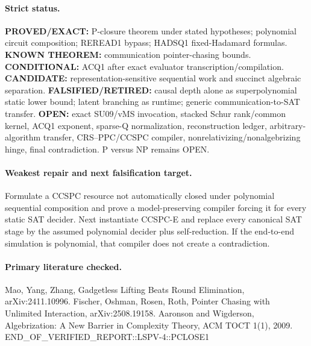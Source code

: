 \documentclass[11pt]{article}
\begin{document}
\paragraph{Strict status.} \textbf{PROVED/EXACT:} P-closure theorem under stated hypotheses; polynomial circuit composition; REREAD1 bypass; HADSQ1 fixed-Hadamard formulas. \textbf{KNOWN THEOREM:} communication pointer-chasing bounds. \textbf{CONDITIONAL:} ACQ1 after exact evaluator transcription/compilation. \textbf{CANDIDATE:} representation-sensitive sequential work and succinct algebraic separation. \textbf{FALSIFIED/RETIRED:} causal depth alone as superpolynomial static lower bound; latent branching as runtime; generic communication-to-SAT transfer. \textbf{OPEN:} exact SU09/vMS invocation, stacked Schur rank/common kernel, ACQ1 exponent, sparse-Q normalization, reconstruction ledger, arbitrary-algorithm transfer, CRS--PPC/CCSPC compiler, nonrelativizing/nonalgebrizing hinge, final contradiction. P versus NP remains OPEN.
\paragraph{Weakest repair and next falsification target.} Formulate a CCSPC resource not automatically closed under polynomial sequential composition and prove a model-preserving compiler forcing it for every static SAT decider. Next instantiate CCSPC-E and replace every canonical SAT stage by the assumed polynomial decider plus self-reduction. If the end-to-end simulation is polynomial, that compiler does not create a contradiction.
\paragraph{Primary literature checked.} Mao, Yang, Zhang, Gadgetless Lifting Beats Round Elimination, arXiv:2411.10996. Fischer, Oshman, Rosen, Roth, Pointer Chasing with Unlimited Interaction, arXiv:2508.19158. Aaronson and Wigderson, Algebrization: A New Barrier in Complexity Theory, ACM TOCT 1(1), 2009.
END_OF_VERIFIED_REPORT::LSPV-4::PCLOSE1
\end{document}
